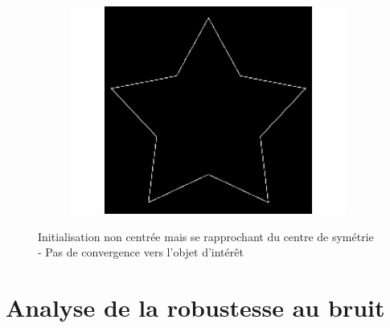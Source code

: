 \begin{figure}[H]
\begin{subfigure}[c]{0.3\linewidth}
\includegraphics[width=\textwidth]{Chapters/Images/Init/vfcusym3}
\caption{}
\end{subfigure}
\caption{Initialisation non centrée mais se rapprochant du centre de symétrie - Pas de convergence vers l'objet d'intérêt}
\end{figure}

\section{Analyse de la robustesse au bruit}
\label{ann_noise_results}

